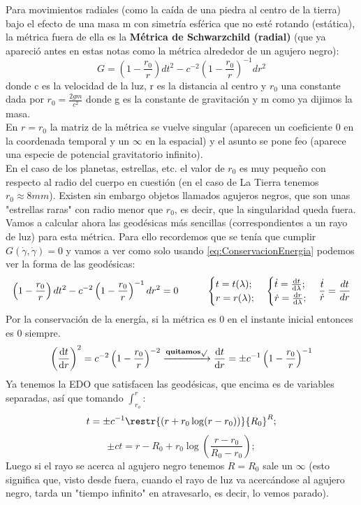\documentclass[palatino, bibnumbers]{apuntes}
\begin{document}
\begin{example}Para movimientos radiales (como la caída de una piedra al centro de la tierra) bajo el efecto de una masa m con simetría esférica que no esté rotando (estática), la métrica fuera de ella es la \textbf{Métrica de Schwarzchild (radial)} (que ya apareció antes en estas notas como la métrica alrededor de un agujero negro):
	$$G=\left(1-\frac{r_0}{r}\right)dt^2-c^{-2}\left(1-\frac{r_0}{r}\right)^{-1}dr^2$$
donde c es la velocidad de la luz, r es la distancia al centro y $r_0$ una constante dada por $r_0=\frac{2gm}{c^2}$ donde g es la constante de gravitación y m como ya dijimos la masa.\\ \indent En $r=r_0$ la matriz de la métrica se vuelve singular (aparecen un coeficiente 0 en la coordenada temporal y un $\infty$ en la espacial) y el asunto se pone feo (aparece una especie de potencial gravitatorio infinito).\\ \indent En el caso de los planetas, estrellas, etc. el valor de $r_0$ es muy pequeño con respecto al radio del cuerpo en cuestión (en el caso de La Tierra tenemos $r_0\approx8mm$). Existen sin embargo objetos llamados agujeros negros, que son unas "estrellas raras" con radio menor que $r_0$, es decir, que la singularidad queda fuera.\\ \indent Vamos a calcular ahora las geodésicas más sencillas (correspondientes a un rayo de luz) para esta métrica. Para ello recordemos que se tenía que cumplir $G(\dot{\gamma},\dot{\gamma})=0$ y vamos a ver como solo usando \ref{eq:ConservacionEnergia} podemos ver la forma de las geodésicas:
$$\left(1-\frac{r_0}{r}\right)dt^2-c^{-2}\left(1-\frac{r_0}{r}\right)^{-1}dr^2=0\hspace*{1cm}\begin{cases}t=t(\lambda);\\r=r(\lambda);\end{cases}\begin{cases}\dot{t}=\dv{t}{\lambda};\\\dot{r}=\dv{r}{\lambda};\end{cases}\frac{\dot{t}}{\dot{r}}=\frac{dt}{dr}$$ 
\indent Por la conservación de la energía, si la métrica es 0 en el instante inicial entonces es 0 siempre.
$$\left(\dv{t}{r}\right)^2=c^{-2}\left(1-\frac{r_0}{r}\right)^{-2}\xrightarrow{\textbf{quitamos} \sqrt{}}\dv{t}{r}=\pm c^{-1}\left(1-\frac{r_0}{r}\right)^{-1}$$
Ya tenemos la EDO que satisfacen las geodésicas, que encima es de variables separadas, así que tomando $\int_{r_o}^{r}$:
$$t=\pm c^{-1}\restr{(r+r_0\log(r-r_0))}{R_0}^R;$$
$$\pm ct=r-R_0+r_0\log(\frac{r-r_0}{R_0-r_0});$$
Luego si el rayo se acerca al agujero negro tenemos $R=R_0$ sale un $\infty$ (esto significa que, visto desde fuera, cuando el rayo de luz va acercándose al agujero negro, tarda un "tiempo infinito" en atravesarlo, es decir, lo vemos parado).
\end{example}
\end{document}
